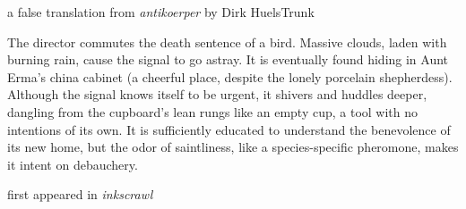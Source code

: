 a false translation from \emph{antikoerper} by Dirk HuelsTrunk

The director commutes the death sentence of a bird. Massive clouds,
laden with burning rain, cause the signal to go astray. It is eventually
found hiding in Aunt Erma's china cabinet (a cheerful place, despite the
lonely porcelain shepherdess). Although the signal knows itself to be
urgent, it shivers and huddles deeper, dangling from the cupboard's lean
rungs like an empty cup, a tool with no intentions of its own. It is
sufficiently educated to understand the benevolence of its new home, but
the odor of saintliness, like a species-specific pheromone, makes it
intent on debauchery.

first appeared in \emph{inkscrawl}
